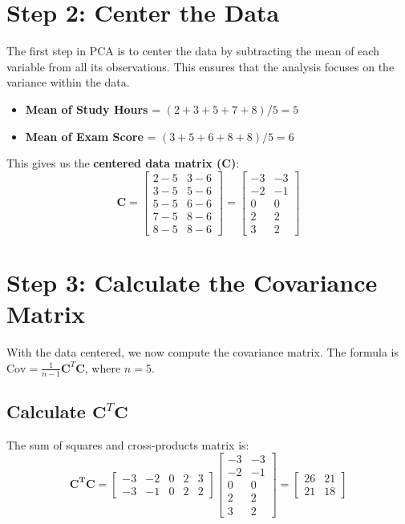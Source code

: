 \documentclass{article}
\begin{document}
\section{Step 2: Center the Data}

The first step in PCA is to center the data by subtracting the mean of each variable from all its observations. This ensures that the analysis focuses on the variance within the data.

\begin{itemize}
    \item \textbf{Mean of Study Hours} = $(2+3+5+7+8) / 5 = 5$
    \item \textbf{Mean of Exam Score} = $(3+5+6+8+8) / 5 = 6$
\end{itemize}

This gives us the \textbf{centered data matrix (C)}:
\[
\mathbf{C} =
\begin{bmatrix}
2-5 & 3-6 \\
3-5 & 5-6 \\
5-5 & 6-6 \\
7-5 & 8-6 \\
8-5 & 8-6
\end{bmatrix}
=
\begin{bmatrix}
-3 & -3 \\
-2 & -1 \\
0 & 0 \\
2 & 2 \\
3 & 2
\end{bmatrix}
\]

\section{Step 3: Calculate the Covariance Matrix}

With the data centered, we now compute the covariance matrix. The formula is $\text{Cov} = \frac{1}{n-1} \mathbf{C}^T \mathbf{C}$, where $n=5$.

\subsection{Calculate $\mathbf{C}^T \mathbf{C}$}
The sum of squares and cross-products matrix is:
\[
\mathbf{C^T C} =
\begin{bmatrix}
-3 & -2 & 0 & 2 & 3 \\
-3 & -1 & 0 & 2 & 2
\end{bmatrix}
\begin{bmatrix}
-3 & -3 \\
-2 & -1 \\
0 & 0 \\
2 & 2 \\
3 & 2
\end{bmatrix}
=
\begin{bmatrix}
26 & 21 \\
21 & 18
\end{bmatrix}
\]
\end{document}
